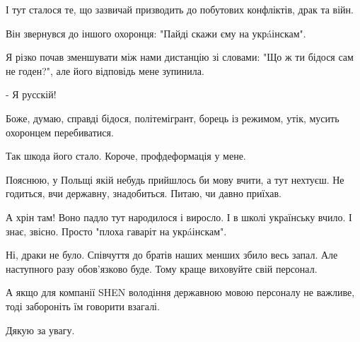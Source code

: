 І тут сталося те, що зазвичай призводить до побутових конфліктів, драк та війн. 

Він звернувся до іншого охоронця: "Пайді скажи єму на укрáінскам".

Я різко почав зменшувати між нами дистанцію зі словами: "Що ж ти бідося сам не
годен?", але його відповідь мене зупинила. 

- Я русскій!

Боже, думаю, справді бідося, політемігрант, борець із режимом, утік, мусить
охоронцем перебиватися. 

Так шкода його стало. Короче, профдеформація у мене. 

Пояснюю, у Польщі якій небудь прийшлось би мову вчити, а тут нехтуєш. Не
годиться, вчи державну, знадобиться. Питаю, чи давно приїхав. 

А хрін там! Воно падло тут народилося і виросло. І в школі українську вчило. І
знає, звісно. Просто "плоха гаваріт на укрáінскам".

Ні, драки не було. Співчуття до братів наших менших збило весь запал. Але
наступного разу обов’язково буде. Тому краще виховуйте свій персонал. 

А якщо для компанії SHEN володіння державною мовою персоналу не важливе, тоді
забороніть їм говорити взагалі. 

Дякую за увагу.

